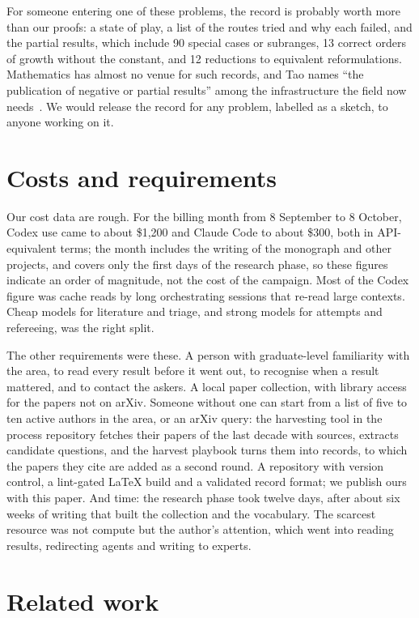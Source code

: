\documentclass[11pt]{amsart}
\newcommand*{\sectionbreak}{\clearpage} %
\begin{document}
For someone entering one of these problems, the record is probably worth more
than our proofs: a state of play, a list of the routes tried and why each
failed, and the partial results, which include 90 special cases or subranges,
13 correct orders of growth without the constant, and 12 reductions to
equivalent reformulations. Mathematics has almost no venue for such records,
and Tao names ``the publication of negative or partial results'' among the
infrastructure the field now needs~\cite{tao-age}. We would release the record
for any problem, labelled as a sketch, to anyone working on it.

\sectionbreak
\section{Costs and requirements}\label{sec:costs}

Our cost data are rough. For the billing month from 8 September to 8 October,
Codex use came to about \$1,200 and Claude Code to about \$300, both in
API-equivalent terms; the month includes the writing of the monograph and other
projects, and covers only the first days of the research phase, so these
figures indicate an order of magnitude, not the cost of the campaign. Most of
the Codex figure was cache reads by long orchestrating sessions that re-read
large contexts. Cheap models for literature and triage, and strong models for
attempts and refereeing, was the right split.

The other requirements were these. A person with graduate-level familiarity
with the area, to read every result before it went out, to recognise when a
result mattered, and to contact the askers. A local paper collection, with
library access for the papers not on arXiv. Someone without one can start from
a list of five to ten active authors in the area, or an arXiv query: the
harvesting tool in the process repository fetches their papers of the last
decade with sources, extracts candidate questions, and the harvest playbook
turns them into records, to which the papers they cite are added as a second
round. A repository with version control, a lint-gated LaTeX build and a
validated record format; we publish ours with this paper. And time: the
research phase took twelve days, after about six weeks of writing that built
the collection and the vocabulary. The scarcest resource was not compute but
the author's attention, which went into reading results, redirecting agents and
writing to experts.

\sectionbreak
\section{Related work}\label{sec:related}
\end{document}
